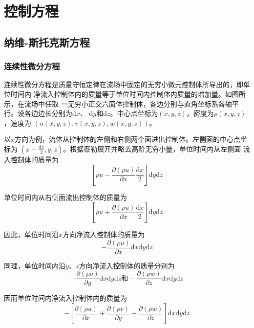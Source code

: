 \chapter{控制方程}
\section{纳维-斯托克斯方程}
\subsection{连续性微分方程}
连续性微分方程是质量守恒定律在流场中固定的无穷小微元控制体所导出的，即单位时间内
净流入控制体内的质量等于单位时间内控制体内质量的增加量。如图所示，在流场中任取
一无穷小正交六面体控制体，各边分别与直角坐标系各轴平行。设各边边长分别为$\mathrm{d}x$、
$\mathrm{d}y$和$\mathrm{d}z$。中心点坐标为$(x,y,z)$，密度为$\rho(x,y,z)$，速度为
$(u(x,y,z), v(x,y,z), w(x,y,z))$。

以$x$方向为例，流体从控制体的左侧和右侧两个面进出控制体。左侧面的中心点坐标为
$(x-\frac{\mathrm{d}x}{2},y,z)$。根据泰勒展开并略去高阶无穷小量，单位时间内从左侧面
流入控制体的质量为
\begin{equation*}
  \left[\rho u-\frac{\partial (\rho u)}{\partial x}\frac {\mathrm{d}x}{2}\right]\mathrm{d}y\mathrm{d}z
\end{equation*}

单位时间内从右侧面流出控制体的质量为
\begin{equation*}
  \left[\rho u+\frac{\partial (\rho u)}{\partial x}\frac {\mathrm{d}x}{2}\right]\mathrm{d}y\mathrm{d}z
\end{equation*}

因此，单位时间沿$x$方向净流入控制体的质量为
\begin{equation}
  -\frac{\partial (\rho u)}{\partial x}\mathrm{d}x\mathrm{d}y\mathrm{d}z
\end{equation}

同理，单位时间内沿$y$、$z$方向净流入控制体的质量分别为
\begin{equation*}
  -\frac{\partial (\rho v)}{\partial y}\mathrm{d}x\mathrm{d}y\mathrm{d}z
  \mbox{和}
  -\frac{\partial (\rho w)}{\partial z}\mathrm{d}x\mathrm{d}y\mathrm{d}z
\end{equation*}

因而单位时间内净流入控制体内的质量为
\begin{equation}
  -
  \left[
    \frac {\partial (\rho u)} {\partial x}
    +
    \frac {\partial (\rho v)} {\partial y}
    +
    \frac {\partial (\rho w)} {\partial z}
  \right]
  \mathrm{d}x\mathrm{d}y\mathrm{d}z
\end{equation}

